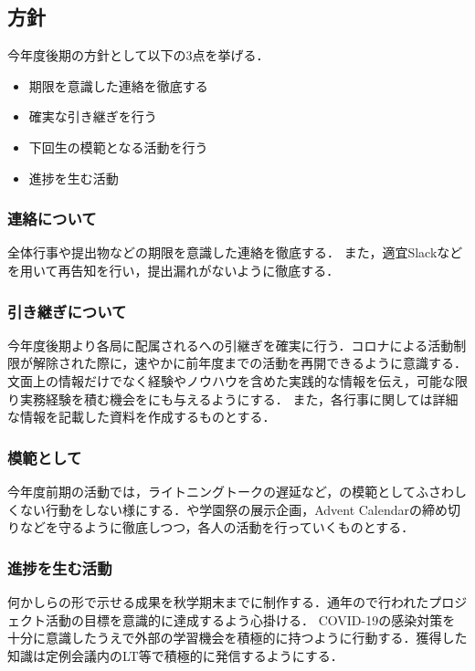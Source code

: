 \subsection*{\newGradeIfKouki{}\secondGrade{}方針}


今年度後期の\secondGrade{}方針として以下の3点を挙げる．

\begin{itemize}
    \item 期限を意識した連絡を徹底する
    \item 確実な引き継ぎを行う
    \item 下回生の模範となる活動を行う
    \item 進捗を生む活動
\end{itemize}

\subsubsection*{連絡について}
全体行事や提出物などの期限を意識した連絡を徹底する．
また，適宜Slackなどを用いて再告知を行い，提出漏れがないように徹底する．

\subsubsection*{引き継ぎについて}
今年度後期より各局に配属される\firstGrade{}への引継ぎを確実に行う．コロナによる活動制限が解除された際に，速やかに前年度までの活動を再開できるように意識する．
文面上の情報だけでなく経験やノウハウを含めた実践的な情報を伝え，可能な限り実務経験を積む機会を\firstGrade{}にも与えるようにする．
また，各行事に関しては詳細な情報を記載した資料を作成するものとする．

\subsubsection*{模範として}
今年度前期の活動では，ライトニングトークの遅延など，\firstGrade{}の模範としてふさわしくない行動をしない様にする．や学園祭の展示企画，Advent Calendarの締め切りなどを守るように徹底しつつ，各人の活動を行っていくものとする．

\subsubsection*{進捗を生む活動}
何かしらの形で示せる成果を秋学期末までに制作する．通年ので行われたプロジェクト活動の目標を意識的に達成するよう心掛ける．
COVID-19の感染対策を十分に意識したうえで外部の学習機会を積極的に持つように行動する．獲得した知識は定例会議内のLT等で積極的に発信するようにする．
